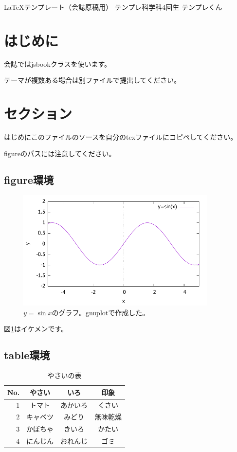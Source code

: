 \documentclass[10pt,b5paper,papersize,dvipdfmx]{jsbook}
\begin{document}


\kaishititle%
  {\LaTeX テンプレート（会誌原稿用）}%
  {テンプレ科学科4回生}%
  {テンプレくん}%

%
\section*{はじめに}
会誌ではjsbookクラスを使います。\par
テーマが複数ある場合は別ファイルで提出してください。

%
\section{セクション}
はじめにこのファイルのソースを自分のtexファイルにコピペしてください。\par
figureのパスには注意してください。


\clearpage
%
\subsection{figure環境}

\begin{figure}[htbp]
  \centering
  \includegraphics[width=10cm]{temp/fig-sin.pdf}
  \caption{$y=\sin x$のグラフ。gnuplotで作成した。}
  \label{fig:sin}
\end{figure}

図\ref{fig:sin}はイケメンです。

%
\subsection{table環境}

\begin{table}[htbp]
  \centering
  \caption{やさいの表}
  \label{tbl:vegetable}
  \begin{tabular}{r|ccc} \hline
      No. & やさい & いろ & 印象 \\ \hline
      1 & トマト & あかいろ & くさい \\
      2 & キャベツ & みどり & 無味乾燥 \\
      3 & かぼちゃ & きいろ & かたい \\
      4 & にんじん & おれんじ & ゴミ \\ \hline
  \end{tabular}
\end{table}
\end{document}
